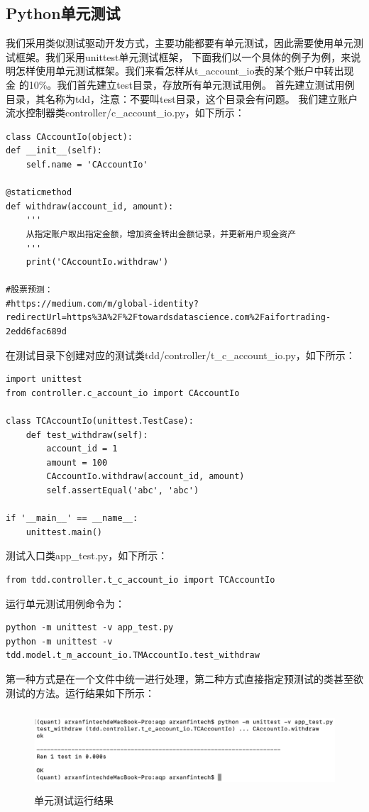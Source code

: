 \documentclass{article}
\begin{document}
\subsection{Python单元测试}
我们采用类似测试驱动开发方式，主要功能都要有单元测试，因此需要使用单元测试框架。我们采用unittest单元测试框架，
下面我们以一个具体的例子为例，来说明怎样使用单元测试框架。我们来看怎样从t\_account\_io表的某个账户中转出现金
的10\%。我们首先建立test目录，存放所有单元测试用例。\newline
首先建立测试用例目录，其名称为tdd，注意：不要叫test目录，这个目录会有问题。\newline
我们建立账户流水控制器类controller/c\_account\_io.py，如下所示：
\begin{lstlisting}
class CAccountIo(object):
def __init__(self):
    self.name = 'CAccountIo'

@staticmethod
def withdraw(account_id, amount):
    '''
    从指定账户取出指定金额，增加资金转出金额记录，并更新用户现金资产
    '''
    print('CAccountIo.withdraw')

#股票预测：
#https://medium.com/m/global-identity?redirectUrl=https%3A%2F%2Ftowardsdatascience.com%2Faifortrading-2edd6fac689d
\end{lstlisting}
在测试目录下创建对应的测试类tdd/controller/t\_c\_account\_io.py，如下所示：
\begin{lstlisting}
import unittest
from controller.c_account_io import CAccountIo

class TCAccountIo(unittest.TestCase):
    def test_withdraw(self):
        account_id = 1
        amount = 100
        CAccountIo.withdraw(account_id, amount)
        self.assertEqual('abc', 'abc')

if '__main__' == __name__:
    unittest.main()
\end{lstlisting}
测试入口类app\_test.py，如下所示：
\begin{lstlisting}
from tdd.controller.t_c_account_io import TCAccountIo
\end{lstlisting}
运行单元测试用例命令为：
\begin{lstlisting}
python -m unittest -v app_test.py
python -m unittest -v tdd.model.t_m_account_io.TMAccountIo.test_withdraw
\end{lstlisting}
第一种方式是在一个文件中统一进行处理，第二种方式直接指定预测试的类甚至欲测试的方法。运行结果如下所示：
\begin{figure}[H]
	\caption{单元测试运行结果}
	\label{f000002}
	\centering
	\includegraphics[height=3cm]{images/f000002}
\end{figure}
\end{document}
